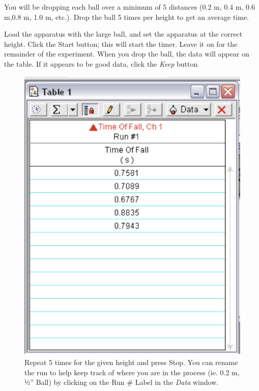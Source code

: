   You will be dropping each ball over a minimum of 5 distances 
(0.2 m, 0.4 m, 0.6 m,0.8 m, 1.0 m, etc.). Drop the ball 5 times per height 
to get an average time.

  Load the apparatus with the large ball, and set the apparatus at the correct 
height. Click the Start button; this will start the timer. Leave it on 
for the remainder of the experiment. When you drop the ball, the data will 
appear on the table. If it appears to be good data, click the \emph{Keep} button

\begin{figure}[ht]
  \centerline{\includegraphics[scale=0.6]{resources/photo7.jpg}}
  \caption{Repeat 5 times for the given height and press Stop. You can rename 
  the run to help keep track of where you are in the process (ie. 0.2 m, 1⁄2” 
  Ball) by clicking on the Run \# Label in the \emph{Data} window.}
  \label{3.4}
\end{figure}

